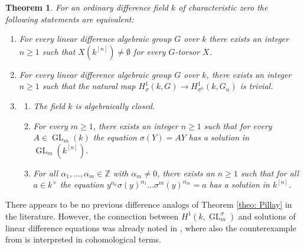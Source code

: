 \documentclass[oneside,reqno]{amsart}
\newtheorem{theo}{Theorem}[section]
\theoremstyle{definition}
\newcommand{\Gl}{\operatorname{GL}}
\newcommand{\s}{\sigma}
\newcommand{\kn}{k^{[n]}}
\begin{document}
\begin{theo} \label{theo: main}
	For an ordinary difference field $k$ of characteristic zero the following statements are equivalent:
\begin{enumerate}
	\item[\rm{(P1$^{u}$)}] For every linear difference algebraic group $G$ over $k$ there exists an integer $n\geq 1$ such that $X(\kn)\neq\emptyset$ for every $G$-torsor $X$. 
	\item[\rm{(P2$^u$)}] For every linear difference algebraic group $G$ over $k$, there exists an integer $n\geq 1$ such that the natural map $H^1_{\s}(k,G)\to H^1_{\s^n}(k,G_n)$ is trivial.
	
	\item[\rm{(P3$^u$)}] 
	\begin{enumerate}
		\item[\rm{(a)}] The field $k$ is algebraically closed.
		\item[\rm{(b)}] For every $m\geq 1$, there exists an integer $n\geq 1$ such that for every $A\in\Gl_m(k)$ the equation $\s(Y)=AY$ has a solution in $\Gl_m(\kn)$. 	
		\item[\rm{(c)}] For all $\alpha_1,\ldots,\alpha_m\in \mathbb{Z}$ with $\alpha_m\neq 0$, there exists an $n\geq 1$ such that for all $a\in k^\times$ the equation $y^{\alpha_0}\s(y)^{\alpha_1}\ldots\s^m(y)^{\alpha_m}=a$
		has a solution in $\kn$.
	\end{enumerate}
\end{enumerate}
\end{theo}







There appears to be no previous difference analogs of Theorem \ref{theo: Pillay} in the literature. However, the connection between $H^1(k,\Gl_m^\s)$ and solutions of linear difference equations was already noted in \cite[Section 7.3]{ChalupnikKowalski:DifferenceSheavesAndTorsors}, where also the counterexample from \cite{ChatzidakisPillay:GeneralizedPVExtensionsAndDifferentialGaloisCohomology} is interpreted in cohomological terms.
\end{document}
